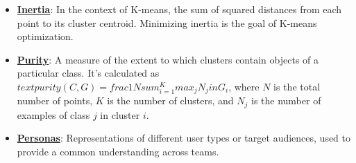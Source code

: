 \documentclass{article}%
\begin{document}
\begin{itemize}[leftmargin=*]
\item \href{https://purdue.brightspace.com/d2l/common/assets/pdfjs-d2l-dist/1.0.14-legacy/web/viewer.html?file=\%2Fcontent\%2Fenforced\%2F1095467-wl.202510.CS.24300.001\%2F12L2-distance-clusters.pdf\%3Fou\%3D1095467\&lang=en-us\&container=d2l-fileviewer-rendered-pdf\&fullscreen=d2l-fileviewer-rendered-pdf-dialog\&height=667#page=33}{\textbf{Inertia}}: In the context of K-means, the sum of squared distances from each point to its cluster centroid. Minimizing inertia is the goal of K-means optimization.%
\item \href{https://purdue.brightspace.com/d2l/common/assets/pdfjs-d2l-dist/1.0.14-legacy/web/viewer.html?file=\%2Fcontent\%2Fenforced\%2F1095467-wl.202510.CS.24300.001\%2F12L2-distance-clusters.pdf\%3Fou\%3D1095467\&lang=en-us\&container=d2l-fileviewer-rendered-pdf\&fullscreen=d2l-fileviewer-rendered-pdf-dialog\&height=667#page=44}{\textbf{Purity}}: A measure of the extent to which clusters contain objects of a particular class. It's calculated as $ text{purity}(C, G) =  frac{1}{N}  sum_{i=1}^{K}  max_j N_j  in G_i$, where $N$ is the total number of points, $K$ is the number of clusters, and $N_j$ is the number of examples of class $j$ in cluster $i$.%
\item \href{https://purdue.brightspace.com/d2l/common/assets/pdfjs-d2l-dist/1.0.14-legacy/web/viewer.html?file=\%2Fcontent\%2Fenforced\%2F1095467-wl.202510.CS.24300.001\%2F12L2-distance-clusters.pdf\%3Fou\%3D1095467\&lang=en-us\&container=d2l-fileviewer-rendered-pdf\&fullscreen=d2l-fileviewer-rendered-pdf-dialog\&height=667#page=11}{\textbf{Personas}}: Representations of different user types or target audiences, used to provide a common understanding across teams.%
\end{itemize}%
\end{document}
